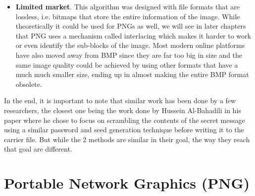 \begin{multicols*}{2}
\begin{itemize}
  \item \textbf{Limited market}. This algorithm was designed with file formats that are lossless, i.e. bitmaps that store the entire information of the image. While theoretically it could be used for PNGs as well, we will see in later chapters that PNG uses a mechanism called interlacing which makes it harder to work or even identify the sub-blocks of the image. Most modern online platforms have also moved away from BMP since they are far too big in size and the same image quality could be achieved by using other formats that have a much much smaller size, ending up in almost making the entire BMP format obsolete.
\end{itemize}
In the end, it is important to note that similar work has been done by a few researchers, the closest one being the work done by Hussein Al-Bahadili\cite{secure_block_permutation} in his paper where he chose to focus on scrambling the contents of the secret message using a similar password and seed generation technique before writing it to the carrier file. But while the 2 methods are similar in their goal, the way they reach that goal are different.


\section{Portable Network Graphics (PNG)} \label{PNG_Explained_Chapter}


\end{multicols*}
